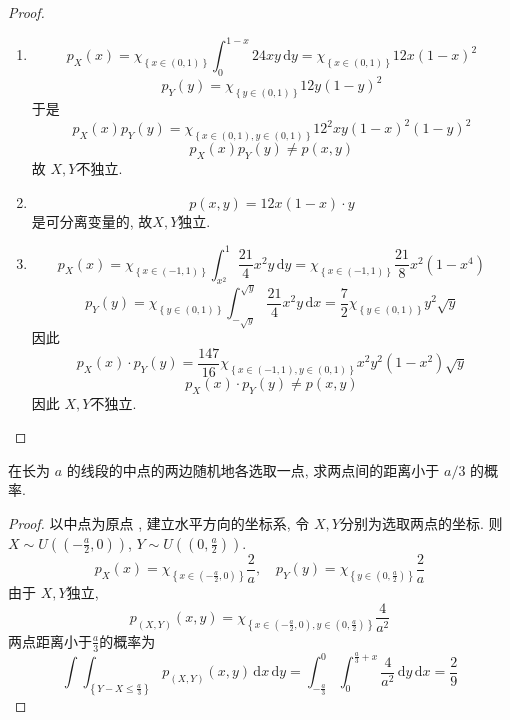 \documentclass[../main.tex]{subfiles}
\begin{document}
\begin{proof}
    \begin{enumerate}
        \item  \[
        p_{X}\left( x \right)= \chi _{\left\{ x\in \left( 0,1 \right) \right\} }\int_{0}^{1-x} 24xy\,\mathrm{d} y= \chi _{\left\{ x\in \left( 0,1 \right)  \right\}}12x \left( 1-x \right)^{2} 
        \] \[
        p_{Y}\left( y \right)= \chi _{\left\{ y\in \left( 0,1 \right)  \right\}}12y \left( 1-y \right)^{2}  
        \]于是 \[
        p_{X}\left( x \right)p_{Y}\left( y \right)= \chi _{\left\{ x\in \left( 0,1 \right),y\in \left( 0,1 \right)   \right\}}12 ^{2}xy\left( 1-x \right)^{2}\left( 1-y \right)^{2}    
        \] \[
        p_{X}\left( x \right)p_{Y}\left( y \right)\neq p\left( x,y \right)   
        \]故 \(  X,Y  \)不独立. 
        \item  \[
        p\left( x,y \right)= 12 x \left( 1-x \right) \cdot y  
        \]是可分离变量的, 故\(  X,Y  \)独立. 
        \item \[
        p_{X}\left( x \right)= \chi _{\left\{ x\in \left( -1,1 \right)  \right\}} \int_{x^{2}}^{1}\frac{21 }{4 }x^{2}y\,\mathrm{d} y= \chi _{\left\{ x\in \left( -1,1 \right)  \right\}}\frac{21 }{8 }x^{2}\left( 1-x^{4} \right)   
        \]  \[
        p_{Y}\left( y \right)= \chi _{\left\{ y\in \left( 0,1 \right)  \right\}} \int_{-\sqrt{y}}^{\sqrt{y}}\frac{21 }{4 }x^{2}y\,\mathrm{d} x = \frac{7 }{2}\chi _{\left\{ y\in \left( 0,1 \right)  \right\}}y^{2}\sqrt{y}  
        \] 因此 \[
        p_{X}\left( x \right)\cdot p_{Y}\left( y \right)= \frac{147 }{16 }\chi _{\left\{ x\in \left( -1,1 \right), y\in \left( 0,1 \right)   \right\}}x^{2}y^{2}\left( 1-x^{2} \right)\sqrt{y}    
        \] \[
        p_{X}\left( x \right)\cdot p_{Y}\left( y \right)\neq p\left( x,y \right)   
        \]因此 \(  X,Y  \)不独立. 
    \end{enumerate}
    
\end{proof}
\begin{exercise}{}{}
在长为 $a$ 的线段的中点的两边随机地各选取一点, 求两点间的距离小于 $a/3$ 的概率.
\end{exercise}
\begin{proof}
    以中点为原点 , 建立水平方向的坐标系, 令 \(  X,Y  \)分别为选取两点的坐标. 则 \(  X\sim U\left( \left( -\frac{a}{2},0 \right)  \right)   \), \(  Y\sim U\left( \left( 0,\frac{a}{2} \right)  \right)   \). \[
    p_{X}\left( x \right) = \chi _{\left\{ x\in \left( -\frac{a}{2} ,0 \right)  \right\}}\frac{2}{a},\quad p_{Y}\left( y \right)= \chi _{\left\{ y\in \left( 0,\frac{a}{2}  \right)  \right\}}\frac{2}{a}
    \]由于 \(  X,Y  \)独立,  \[
    p_{\left( X,Y \right) }\left( x,y \right)=  \chi _{\left\{ x\in \left( -\frac{a}{2} ,0 \right), y\in \left( 0,\frac{a}{2}  \right)   \right\}}\frac{4}{a^{2}}
    \]    两点距离小于\(  \frac{a}{3}  \)的概率为 \[
   \int \int _{\left\{ Y-X\le \frac{a}{3} \right\}} p_{\left( X,Y \right) }\left( x,y \right)\,\mathrm{d} x\,\mathrm{d} y = \int_{-\frac{a}{3}}^{0}\int_{0}^{\frac{a}{3}+ x}\frac{4}{a^{2}}\,\mathrm{d} y\,\mathrm{d} x= \frac{2}{9}
    \] 
\end{proof}
\end{document}
